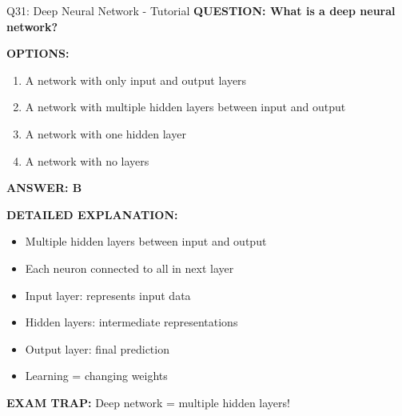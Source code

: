 \documentclass[8pt]{beamer}
\begin{document}
	\begin{frame}{Q31: Deep Neural Network - Tutorial}
		\fontsize{6.5}{7.5}\selectfont
		\textbf{QUESTION: What is a deep neural network?}
		
		\vspace{0.1cm}
		\textbf{OPTIONS:}
		\begin{enumerate}
			\item A network with only input and output layers
			\item A network with multiple hidden layers between input and output
			\item A network with one hidden layer
			\item A network with no layers
		\end{enumerate}
		
		\vspace{0.1cm}
		\textcolor{myblue}{\textbf{ANSWER: B}}
		
		\vspace{0.1cm}
		\textbf{DETAILED EXPLANATION:}
		\begin{itemize}
			\item Multiple hidden layers between input and output
			\item Each neuron connected to all in next layer
			\item Input layer: represents input data
			\item Hidden layers: intermediate representations
			\item Output layer: final prediction
			\item Learning = changing weights
		\end{itemize}
		
		\vspace{0.1cm}
		\textcolor{myred}{\textbf{EXAM TRAP:}} Deep network = \textcolor{myblue}{multiple hidden layers}!
	\end{frame}
	
\end{document}
